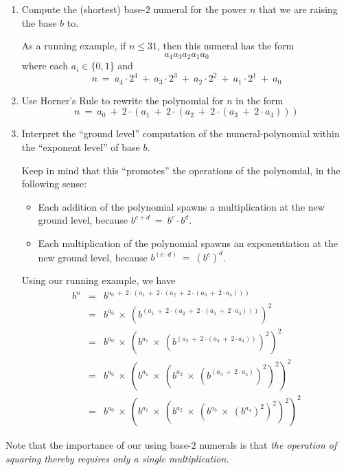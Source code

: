 \begin{enumerate}
\item
Compute the (shortest) base-$2$ numeral for the power $n$ that we are raising the base $b$ to.

\smallskip

As a running example, if $n \leq 31$, then this numeral has the form
\[ a_4 a_3 a_2 a_1 a_0 \]
where each $a_i \in \{0,1\}$ and
\[ n \ = \
a_4 \cdot 2^4 \ + \  a_3 \cdot 2^3 \ + \  a_2 \cdot 2^2 \ + \  a_1 \cdot 2^1 \ + \ a_0
\] 

\item
Use Horner's Rule to rewrite the polynomial for $n$ in the form
\[ n \ = \
a_0 \ + \ 2 \cdot (a_1 \ + \ 2 \cdot (a_2 \ + \ 2 \cdot (a_3 \ + \ 2 \cdot a_4 ))) \]

\item
Interpret the ``ground level'' computation of the numeral-polynomial within the ``exponent level'' of base $b$.

\smallskip

Keep in mind that this ``promotes'' the operations of the polynomial, in the following sense:
\begin{itemize}
\item
Each addition of the polynomial spawns a multiplication at the new ground level, because $b^{c + d} \ = \ b^c \cdot b^d$.
\item
Each multiplication of the polynomial spawns an exponentiation at the new ground level, because $b^{(c \cdot d)} \ = \ (b^c)^d$.
\end{itemize}

\smallskip

Using our running example, we have
\begin{eqnarray*}
b^n & = &
 b^{a_0 \ + \ 2 \cdot (a_1 \ + \ 2 \cdot (a_2 \ + \ 2 \cdot (a_3 \ + \
          2 \cdot a_4 )))} \\
    & = &
 b^{a_0} \ \times \ 
\left( b^{
(a_1 \ + \ 2 \cdot (a_2 \ + \ 2 \cdot (a_3 \ + \ 2 \cdot a_4 )))}
\right)^2 \\
    & = &
 b^{a_0} \ \times \
\left(
b^{a_1}  \ \times \
\left(
b^{(a_2 \ + \ 2 \cdot (a_3 \ + \ 2 \cdot a_4 ))}
\right)^2
\right)^2 \\
    & = &
b^{a_0} \ \times \
\left(
b^{a_1}  \ \times \
\left(
b^{a_2}  \ \times \
\left(
b^{(a_3 \ + \ 2 \cdot a_4 )}
\right)^2
\right)^2
\right)^2 \\
    & = &
b^{a_0} \ \times \
\left(
b^{a_1}  \ \times \
\left(
b^{a_2}  \ \times \
\left(
b^{a_3}  \ \times \
\left(
b^{a_4}
\right)^2
\right)^2
\right)^2
\right)^2
\end{eqnarray*}
\end{enumerate}
Note that the importance of our using base-$2$ numerals is that {\em the operation of squaring thereby requires only a single multiplication}.

